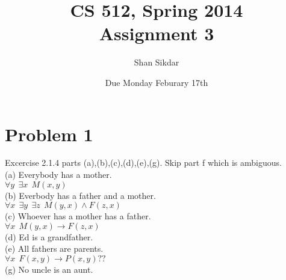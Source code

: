 \documentclass[11pt,leqno,fleqn]{article}
\title{CS 512, Spring 2014
       \\[1ex]
       \textbf{Assignment 3}}
\author{Shan Sikdar}
\date{Due Monday Feburary 17th} %
\begin{document}
\maketitle

\section{Problem 1 }
Excercise 2.1.4 parts (a),(b),(c),(d),(e),(g). Skip part f which is ambiguous.\\
(a) Everybody has a mother.\\
$\forall y \ \ \exists x \ \ M(x,y)$\\
(b) Everbody has a father and a mother.\\
$\forall x \ \ \exists y  \ \ \exists z  \ \ M(y,x) \land F(z,x)$\\
(c) Whoever has a mother has a father.\\
$\forall x \ \ M(y,x) \to F(z,x)$\\
(d) Ed is a grandfather.\\
(e) All fathers are parents.\\
$\forall x \ \ F(x,y) \to P(x,y) ?? $\\
(g) No uncle is an aunt.\\
\end{document}
